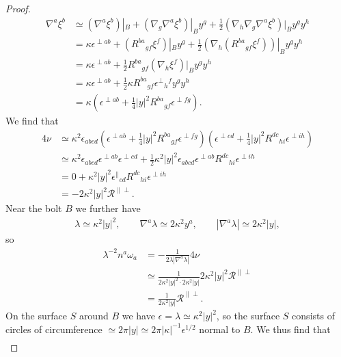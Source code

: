 \documentclass[a4paper,10pt,reqno]{amsart}
\newcommand{\bolt}{B}
\newcommand{\cR}{\mathcal{R}}
\theoremstyle{plain}
\newcommand{\eps}{\epsilon}
\numberwithin{equation}{section}
\begin{document}
\begin{proof}
\begin{align}
\nabla^a \xi^b 
&\simeq 
(\nabla^a \xi^b)|_\bolt + (\nabla_g \nabla^a \xi^b)|_\bolt y^g
+ \frac{1}{2} (\nabla_h \nabla_g \nabla^a \xi^b)|_\bolt y^g y^h \nonumber \\
&=
\kappa \eps^{\perp ab} + (R^{ba}{}_{gf} \xi^f)|_\bolt y^g
+ \frac{1}{2} (\nabla_h (R^{ba}{}_{gf} \xi^f))|_\bolt y^g y^h \nonumber \\
&= \kappa \eps^{\perp ab} +
\frac{1}{2}R^{ba}{}_{gf} (\nabla_h \xi^f)|_\bolt y^g y^h \nonumber \\
&=
\kappa \eps^{\perp ab} +
\frac{1}{2}\kappa R^{ba}{}_{gf} \eps^{\perp}{}_h{}^f y^g y^h \nonumber \\
&=
\kappa \left(
\eps^{\perp ab} + \frac{1}{4}|y|^2 R^{ba}{}_{gf}\eps^{\perp fg} 
\right).
\end{align}
We find that 
\begin{align}
4\nu 
&\simeq
\kappa^2 \eps_{abcd}
\left(
\eps^{\perp ab} + \frac{1}{4}|y|^2 R^{ba}{}_{gf}\eps^{\perp fg} 
\right)
\left(
\eps^{\perp cd} + \frac{1}{4}|y|^2 R^{dc}{}_{hi}\eps^{\perp ih} 
\right) \nonumber \\
&\simeq
\kappa^2 \eps_{abcd} \eps^{\perp ab} \eps^{\perp cd} 
+ \frac{1}{2}\kappa^2 |y|^2 \eps_{abcd} \eps^{\perp ab}
R^{dc}{}_{hi} \eps^{\perp ih} \nonumber \\
&=
0 + 
\kappa^2 |y|^2 \eps^{\parallel}{}_{cd} R^{dc}{}_{hi} \eps^{\perp ih} \nonumber \\
&=
- 2 \kappa^2 |y|^2 \cR^{\parallel\perp}. \label{eq:Rparper}
\end{align}
Near the bolt $\bolt$ we further have 
\begin{align}
\lambda \simeq \kappa^2 |y|^2, \qquad
\nabla^a \lambda \simeq 2 \kappa^2 y^a, \qquad 
|\nabla^a \lambda| \simeq 2 \kappa^2 |y|,
\end{align}
so
\begin{align}
\lambda^{-2} n^a \omega_a 
&= - \frac{1}{2\lambda|\nabla^a \lambda| } 4 \nu \nonumber \\
&\simeq
\frac{1}{2 \kappa^2 |y|^2 \cdot 2 \kappa^2 |y|} 2 \kappa^2 |y|^2 \cR^{\parallel\perp} \nonumber \\
&=
\frac{1}{2\kappa^2|y|}\cR^{\parallel\perp}. 
\end{align}
On the surface $S$ around $\bolt$ we have $\eps = \lambda \simeq \kappa^2 |y|^2$, so the surface $S$ consists of circles of circumference $\simeq 2\pi |y| \simeq 2\pi |\kappa|^{-1}\eps^{1/2}$ normal to $\bolt$. We thus find that
\begin{align}

\end{align}
\end{proof}
\end{document}
